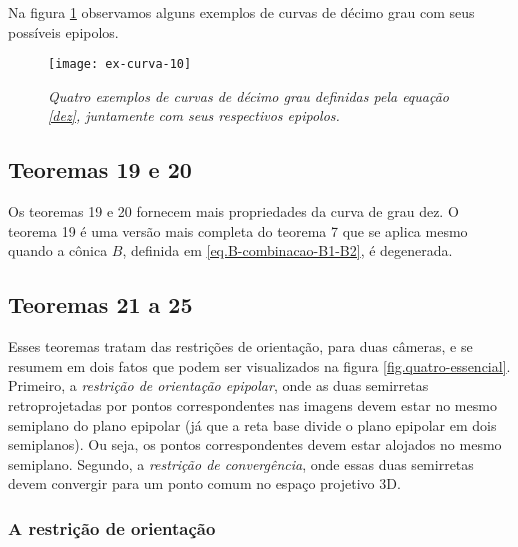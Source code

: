 Na figura \ref{curva-10} observamos alguns exemplos de curvas de décimo grau com seus possíveis epipolos. 

\begin{figure}[!htb]
\centering
\texttt{[image: ex-curva-10]}
\caption{\textit{Quatro exemplos de curvas de décimo grau definidas pela equação \ref{dez}, juntamente com seus respectivos epipolos.}}
\label{curva-10}
\end{figure}

\subsection{Teoremas 19 e 20}

Os teoremas 19 e 20 fornecem mais propriedades da curva de grau dez. O teorema 19 é uma versão mais completa do teorema 7 que se aplica mesmo quando a cônica $B$, definida em \ref{eq.B-combinacao-B1-B2}, é degenerada.

\subsection{Teoremas 21 a 25}

Esses teoremas tratam das restrições de orientação, para duas câmeras, e se resumem em dois fatos que podem ser visualizados na figura \ref{fig.quatro-essencial}. Primeiro, a {\it restrição de orientação epipolar}, onde as duas semirretas retroprojetadas por pontos correspondentes nas imagens devem estar no mesmo semiplano do plano epipolar (já que a reta base divide o plano epipolar em dois semiplanos). Ou seja, os pontos correspondentes devem estar alojados no mesmo semiplano. Segundo, a {\it restrição de convergência}, onde essas duas semirretas devem convergir para um ponto comum no espaço projetivo 3D.  

\subsubsection{A restrição de orientação}

